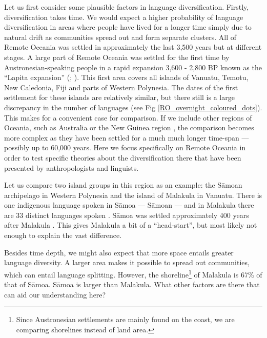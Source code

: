 \documentclass[12pt,letterpaper]{article}
\begin{document}
Let us first consider some plausible factors in language diversification. Firstly, diversification takes time. We would expect a higher probability of language diversification in areas where people have lived for a longer time simply due to natural drift as communities spread out and form separate clusters. All of Remote Oceania was settled in approximately the last 3,500 years but at different stages. A large part of Remote Oceania was settled for the first time by Austronesian-speaking people in a rapid expansion 3,600 - 2,800 BP known as the ``Lapita expansion'' (\citet[106-7]{bellwood2006austronesians}; \citet[137]{rieth_cochrane_2018}). This first area covers all islands of Vanuatu, Temotu, New Caledonia, Fiji and parts of Western Polynesia. The dates of the first settlement for these islands are relatively similar, but there still is a large discrepancy in the number of languages (see Fig \ref{RO_overnight_coloured_dots}). This makes for a convenient case for comparison. If we include other regions of Oceania, such as Australia or the New Guinea region \citep{ross2017_new_guinea_region}, the comparison becomes more complex as they have been settled for a much much longer time-span --- possibly up to 60,000 years. Here we focus specifically on Remote Oceania in order to test specific theories about the diversification there that have been presented by anthropologists and linguists.

Let us compare two island groups in this region as an example: the S\={a}moan archipelago in Western Polynesia and the island of Malakula in Vanuatu. There is one indigenous language spoken in S\={a}moa ---  S\={a}moan --- and in Malakula there are 33 distinct languages spoken \citep{glottolog4_5}. S\={a}moa was settled approximately 400 years after Malakula \citep[137-8]{rieth_cochrane_2018}. This gives Malakula a bit of a ``head-start'', but most likely not enough to explain the vast difference.

Besides time depth, we might also expect that more space entails greater language diversity. A larger area makes it possible to spread out communities, which can entail language splitting. However, the shoreline\footnote{Since Austronesian settlements are mainly found on the coast, we are comparing shorelines instead of land area.} of Malakula is 67\% of that of S\={a}moa. S\={a}moa is larger than Malakula. What other factors are there that can aid our understanding here?
\end{document}
